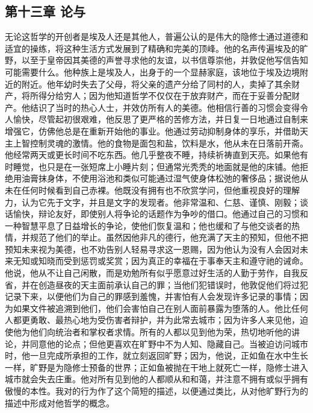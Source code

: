 
\subsection{第十三章 论与}

无论这哲学的开创者是埃及人还是其他人，普遍公认的是伟大的隐修士通过道德和适宜的操练，将这种生活方式发展到了精确和完美的顶峰。他的名声传遍埃及的旷野，以至于皇帝因其美德的声誉寻求他的友谊，以书信尊崇他，并敦促他写信告知可能需要什么。他种族上是埃及人，出身于的一个显赫家庭，该地位于埃及边境附近的附近。他年幼时失去了父母，将父亲的遗产分给了同村的人，卖掉了其余财产，将所得分给穷人；因为他知道哲学不仅仅在于放弃财产，而在于妥善分配财产。他结识了当时的热心人士，并效仿所有人的美德。他相信行善的习惯会变得令人愉快，尽管起初很艰难，他反思了更严格的苦修方法，并日复一日地通过自制来增强它，仿佛他总是在重新开始他的事业。他通过劳动抑制身体的享乐，并借助天主上智控制灵魂的激情。他的食物是面包和盐，饮料是水，他从未在日落前开斋。他经常两天或更长时间不吃东西。他几乎整夜不睡，持续祈祷直到天亮。如果他有时睡觉，也只是在一张短席上小睡片刻；但通常光秃秃的地面就是他的床铺。他拒绝用油膏抹身体，不使用浴池和类似可能通过湿气使身体松弛的奢侈品；据说他从未在任何时候看到自己赤裸。他既没有拥有也不欣赏学问，但他重视良好的理解力，认为它先于文字，并且是文字的发现者。他非常温和、仁慈、谨慎、刚毅；谈话愉快，辩论友好，即使别人将争论的话题作为争吵的借口。他通过自己的习惯和一种智慧平息了日益增长的争论，使他们恢复温和；他也缓和了与他交谈者的热情，并规范了他们的举止。虽然因他非凡的德行，他充满了天主的预知，但他不把预知未来视为美德，也不劝告别人轻易寻求这一恩赐，因为他认为没有人会因对未来无知或知晓而受到惩罚或奖赏；因为真正的幸福在于事奉天主和遵守祂的诫命。他说，他从不让自己闲散，而是劝勉所有似乎愿意过好生活的人勤于劳作，自我反省，并在创造昼夜的天主面前承认自己的罪；当他们犯错误时，他敦促他们将过犯记录下来，以便他们为自己的罪感到羞愧，并害怕有人会发现许多记录的事情；因为如果文件被追溯到他们，他们会害怕自己在别人面前暴露为堕落的人。他比任何人都更勇敢、最热心地为受伤害者辩护，并为此常去城市；因为许多人来见他，迫使他为他们向统治者和掌权者求情。所有的人都以见到他为荣，热切地听他的讲论，并同意他的论点；但他更喜欢在旷野中不为人知、隐藏自己。当被迫访问城市时，他一旦完成所承担的工作，就立刻返回旷野；因为，他说，正如鱼在水中生长一样，旷野是为隐修士预备的世界；正如鱼被抛在干地上就死亡一样，隐修士进入城市就会失去庄重。他对所有见到他的人都顺从和和蔼，并注意不拥有或似乎拥有傲慢的本性。我对的行为作了这个简短的描述，以便通过类比，从对他旷野行为的描述中形成对他哲学的概念。\par

